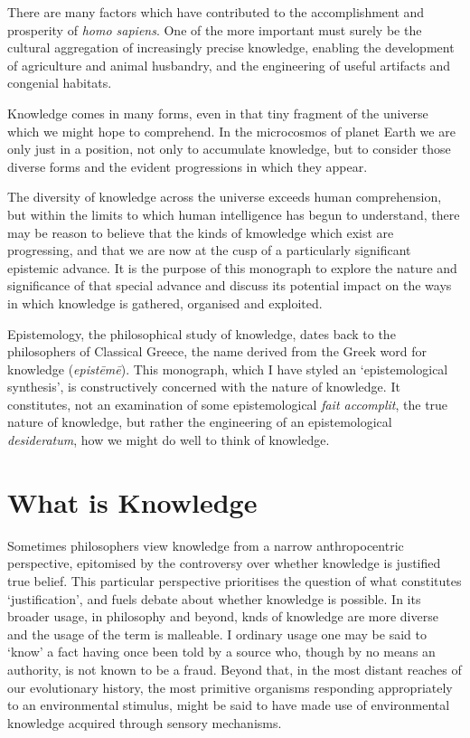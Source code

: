 There are many factors which have contributed to the accomplishment and prosperity of \emph{homo sapiens}.
One of the more important must surely be the cultural aggregation of increasingly precise knowledge, enabling the development of agriculture and animal husbandry, and the engineering of useful artifacts and congenial habitats.

Knowledge comes in many forms, even in that tiny fragment of the universe which we might hope to comprehend.
In the microcosmos of planet Earth we are only just in a position, not only to accumulate knowledge, but to consider those diverse forms and the evident progressions in which they appear.

The diversity of knowledge across the universe exceeds human comprehension, but within the limits to which human intelligence has begun to understand, there may be reason to believe that the kinds of kmowledge which exist are progressing, and that we are now at the cusp of a particularly significant epistemic advance.
It is the purpose of this monograph to explore the nature and significance of that special advance and discuss its potential impact on the ways in which knowledge is gathered, organised and exploited.

Epistemology, the philosophical study of knowledge, dates back to the phi\-lo\-so\-phers of Classical Greece, the name derived from the Greek word for knowledge 
 (\emph{epis\-tēmē}).
This monograph, which I have styled an `epistemological synthesis', is constructively concerned with the nature of knowledge.
It constitutes, not an examination of some epistemological \emph{fait accomplit}, the true nature of knowledge, but rather the engineering of an epistemological \emph{desideratum}, how we might do well to think of knowledge.

\section{What is Knowledge}

Sometimes philosophers view knowledge from a narrow anthropocentric perspective, epitomised by the controversy over whether knowledge is justified true belief.
This particular perspective prioritises the question of what constitutes `justification', and fuels debate about whether knowledge is possible.
In its broader usage, in philosophy and beyond, knds of knowledge are more diverse and the usage of the term is malleable.
I ordinary usage one may be said to `know' a fact having once been told by a source who, though by no means an authority, is not known to be a fraud.
Beyond that, in the most distant reaches of our evolutionary history, the most primitive organisms responding appropriately to an environmental stimulus, might be said to have made use of environmental knowledge acquired through sensory mechanisms.

